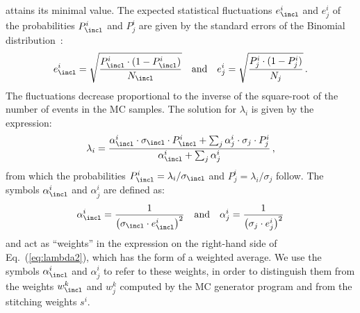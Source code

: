 attains its minimal value.
The expected statistical fluctuations $e_{\incl}^{i}$ and $e_{j}^{i}$ of the probabilities $P_{\incl}^{i}$ and $P_{j}^{i}$
are given by the standard errors of the Binomial distribution~\cite{Cowan:1998ji}:
\begin{equation*}
e_{\incl}^{i} = \sqrt{\frac{P_{\incl}^{i} \cdot (1 - P_{\incl}^{i})}{N_{\incl}}} \quad \mbox{and} \quad e_{j}^{i} = \sqrt{\frac{P_{j}^{i} \cdot (1 - P_{j}^{i})}{N_{j}}} \, .
\end{equation*}
The fluctuations decrease proportional to the inverse of the square-root of the number of events in the MC samples.
The solution for $\lambda_{i}$ is given by the expression:
\begin{equation}
\lambda_{i} = \frac{\alpha_{\incl}^{i} \cdot \sigma_{\incl} \cdot P_{\incl}^{i} + \sum_{j} \alpha_{j}^{i} \cdot \sigma_{j} \cdot P_{j}^{i}}{\alpha_{\incl}^{i} + \sum_{j} \alpha_{j}^{i}} \, ,
\label{eq:lambda2}
\end{equation}
from which the probabilities $P_{\incl}^{i} = \lambda_{i}/\sigma_{\incl}$ and $P_{j}^{i} = \lambda_{i}/\sigma_{j}$ follow.
The symbols $\alpha_{\incl}^{i}$ and $\alpha_{j}^{i}$ are defined as:
\begin{equation*}
\alpha_{\incl}^{i} = \frac{1}{\left( \sigma_{\incl} \cdot e_{\incl}^{i} \right)^{2}} \quad \mbox{and} \quad \alpha_{j}^{i} = \frac{1}{\left( \sigma_{j} \cdot e_{j}^{i} \right)^{2}}
\end{equation*}
and act as ``weights'' in the expression on the right-hand side of Eq.~(\ref{eq:lambda2}),
which has the form of a weighted average.
We use the symbols $\alpha_{\incl}^{i}$ and $\alpha_{j}^{i}$ to refer to these weights,
in order to distinguish them from the weights $w_{\incl}^{k}$ and $w_{j}^{k}$ computed by the MC generator program
and from the stitching weights $s^{i}$.
